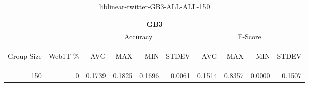 \begin{center}
\begin{table}[htbp]
\begin{tabular}{ | r | r | r | r | r | r | r | r | r | r |}
\hline
\multicolumn{10}{|c|}{GB3}\\
\hline
 & & \multicolumn{4}{|c|}{Accuracy} & \multicolumn{4}{|c|}{F-Score}\\ \cline{3-10}
\begin{sideways}Group Size\end{sideways} & \begin{sideways}Web1T \%\end{sideways} & \begin{sideways}AVG\end{sideways} & \begin{sideways}MAX\end{sideways} & \begin{sideways}MIN\end{sideways} & \begin{sideways}STDEV\end{sideways} & \begin{sideways}AVG\end{sideways} & \begin{sideways}MAX\end{sideways} & \begin{sideways}MIN\end{sideways} & \begin{sideways}STDEV\end{sideways}\\
\hline
\multirow{0}{*}{150}
 & 0 & 0.1739 & 0.1825 & 0.1696 & 0.0061 & 0.1514 & 0.8357 & 0.0000 & 0.1507\\ \cline{2-10}
\hline
\end{tabular}
\caption{liblinear-twitter-GB3-ALL-ALL-150}
\label{table:liblinear-twitter-GB3-ALL-ALL-150}
\end{table}
\end{center}

